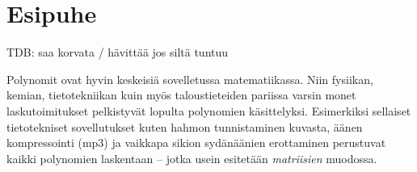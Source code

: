 \chapter{Esipuhe}

TDB: saa korvata / hävittää jos siltä tuntuu

Polynomit ovat hyvin keskeisiä sovelletussa matematiikassa.
Niin fysiikan, kemian, tietotekniikan kuin myös taloustieteiden
pariissa varsin monet laskutoimitukset pelkistyvät lopulta
polynomien käsittelyksi. Esimerkiksi sellaiset tietotekniset
sovellutukset kuten hahmon tunnistaminen kuvasta, äänen
kompressointi (mp3) ja vaikkapa sikion sydänäänien erottaminen
perustuvat kaikki polynomien laskentaan -- jotka usein esitetään
\emph{matriisien} muodossa.
